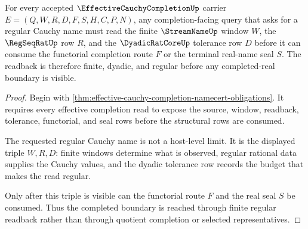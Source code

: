 \begin{theorem}\label{thm:effective-cauchy-completion-regular-readback}
For every accepted $\EffectiveCauchyCompletionUp$ carrier $E=(Q,W,R,D,F,S,H,C,P,N)$, any completion-facing query that asks for a regular Cauchy name must read the finite $\StreamNameUp$ window $W$, the $\RegSeqRatUp$ row $R$, and the $\DyadicRatCoreUp$ tolerance row $D$ before it can consume the functorial completion route $F$ or the terminal real-name seal $S$. The readback is therefore finite, dyadic, and regular before any completed-real boundary is visible.
\end{theorem}
\begin{proof}
Begin with \autoref{thm:effective-cauchy-completion-namecert-obligations}. It requires every effective completion read to expose the source, window, readback, tolerance, functorial, and seal rows before the structural rows are consumed.

The requested regular Cauchy name is not a host-level limit. It is the displayed triple $W,R,D$: finite windows determine what is observed, regular rational data supplies the Cauchy values, and the dyadic tolerance row records the budget that makes the read regular.

Only after this triple is visible can the functorial route $F$ and the real seal $S$ be consumed. Thus the completed boundary is reached through finite regular readback rather than through quotient completion or selected representatives.
\end{proof}

